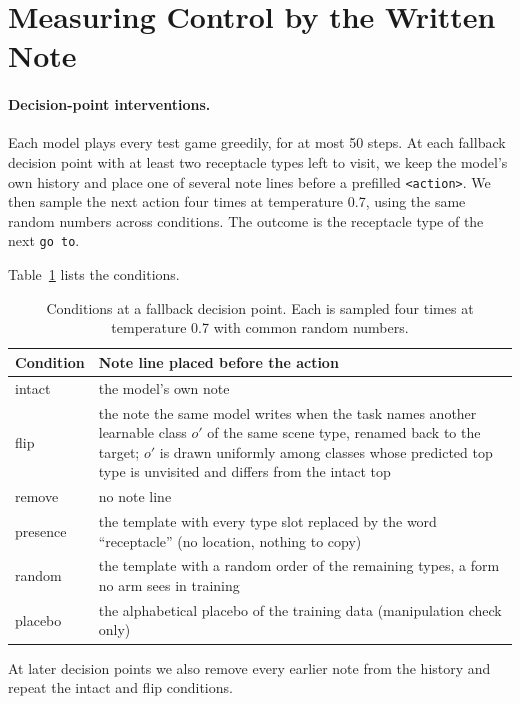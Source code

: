 \section{Measuring Control by the Written Note}
\label{sec:measurement}

\paragraph{Decision-point interventions.}
Each model plays every test game greedily, for at most 50 steps. At each fallback decision point with at least two receptacle types left to visit, we keep the model's own history and place one of several note lines before a prefilled \texttt{<action>}. We then sample the next action four times at temperature 0.7, using the same random numbers across conditions. The outcome is the receptacle type of the next \texttt{go to}.

Table~\ref{tab:conditions} lists the conditions.

\begin{table}[t]
\centering\small
\begin{tabular}{@{}lp{}@{}}
\toprule
Condition & Note line placed before the action \\
\midrule
intact & the model's own note \\
flip & the note the same model writes when the task names another learnable class $o'$ of the same scene type, renamed back to the target; $o'$ is drawn uniformly among classes whose predicted top type is unvisited and differs from the intact top \\
remove & no note line \\
presence & the template with every type slot replaced by the word ``receptacle'' (no location, nothing to copy) \\
random & the template with a random order of the remaining types, a form no arm sees in training \\
placebo & the alphabetical placebo of the training data (manipulation check only) \\
\bottomrule
\end{tabular}
\caption{Conditions at a fallback decision point. Each is sampled four times at temperature 0.7 with common random numbers.}
\label{tab:conditions}
\end{table}

At later decision points we also remove every earlier note from the history and repeat the intact and flip conditions.

